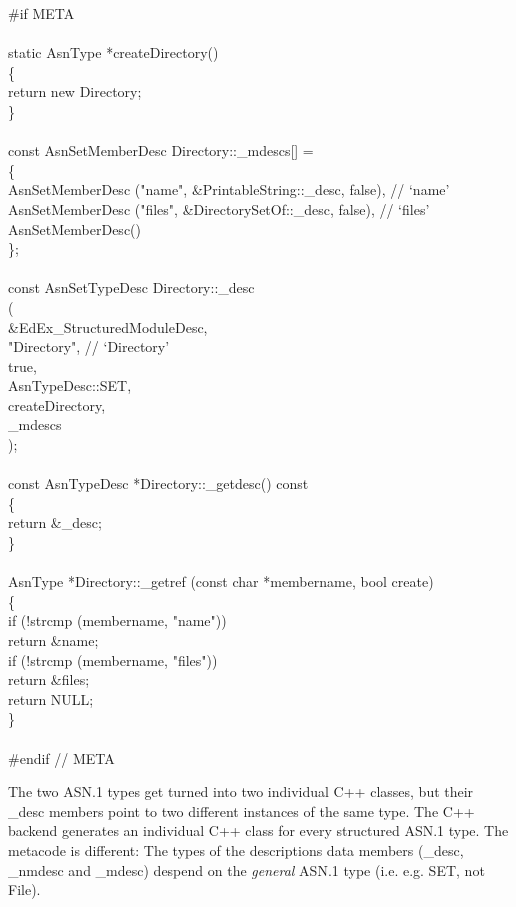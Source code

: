 \begin{Ccode}
\#if META\\
\\
static AsnType *createDirectory()\\
\{\\
  \>return new Directory;\\
\}\\
\\
const AsnSetMemberDesc Directory::\_mdescs[] =\\
\{\+\\
  AsnSetMemberDesc ("name", \&PrintableString::\_desc, false), // `name'\\
  AsnSetMemberDesc ("files", \&DirectorySetOf::\_desc, false), // `files'\\
  AsnSetMemberDesc()\-\\
\};\\
\\
const AsnSetTypeDesc Directory::\_desc\\
(\+\\
  \&EdEx\_StructuredModuleDesc,\\
  "Directory", // `Directory'\\
  true,\\
  AsnTypeDesc::SET,\\
  createDirectory,\\
  \_mdescs\-\\
);\\
\\
const AsnTypeDesc *Directory::\_getdesc() const\\
\{\\
  \>return \&\_desc;\\
\}\\
\\
AsnType *Directory::\_getref (const char *membername, bool create)\\
\{\+\\
  if (!strcmp (membername, "name"))\\
    \>return \&name;\\
  if (!strcmp (membername, "files"))\\
    \>return \&files;\\
  return NULL;\-\\
\}\\
\\
\#endif // META
\end{Ccode}

The two ASN.1 types get turned into two individual C++ classes, but their {\C \_desc} members point to two different instances of the same type.
The C++ backend generates an individual C++ class for every structured ASN.1 type.
The metacode is different: 
The types of the descriptions data members ({\C \_desc}, {\C \_nmdesc} and {\C \_mdesc}) despend on the \emph{general} ASN.1 type (i.e. e.g. {\ASN SET}, not {\ASN File}).







